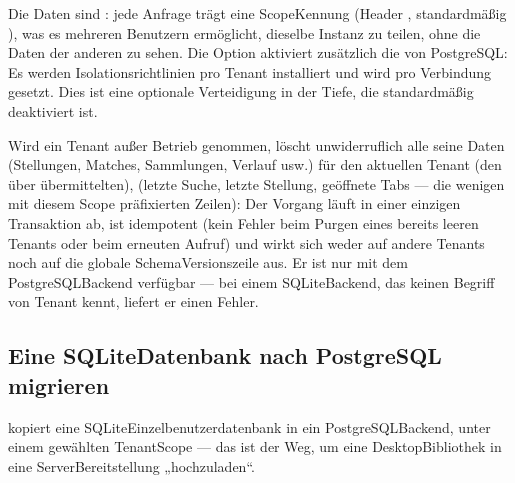 \documentclass[letterpaper,10pt,german]{sphinxmanual}
\begin{document}
\sphinxAtStartPar
Die Daten sind : jede Anfrage trägt eine Scope\sphinxhyphen{}Kennung (Header , standardmäßig ), was es mehreren Benutzern ermöglicht, dieselbe Instanz zu teilen, ohne die Daten der anderen zu sehen. Die Option  aktiviert zusätzlich die  von PostgreSQL: Es werden Isolationsrichtlinien pro Tenant installiert und  wird pro Verbindung gesetzt. Dies ist eine optionale Verteidigung in der Tiefe, die standardmäßig deaktiviert ist.

\sphinxAtStartPar
Wird ein Tenant außer Betrieb genommen, löscht  unwiderruflich alle seine Daten (Stellungen, Matches, Sammlungen, Verlauf usw.) für den aktuellen Tenant (den über  übermittelten),  (letzte Suche, letzte Stellung, geöffnete Tabs — die wenigen mit diesem Scope präfixierten \sphinxhyphen{}Zeilen): Der Vorgang läuft in einer einzigen Transaktion ab, ist idempotent (kein Fehler beim Purgen eines bereits leeren Tenants oder beim erneuten Aufruf) und wirkt sich weder auf andere Tenants noch auf die globale Schema\sphinxhyphen{}Versionszeile aus. Er ist nur mit dem PostgreSQL\sphinxhyphen{}Backend verfügbar — bei einem SQLite\sphinxhyphen{}Backend, das keinen Begriff von Tenant kennt, liefert er einen \sphinxhyphen{}Fehler.


\subsection{Eine SQLite\sphinxhyphen{}Datenbank nach PostgreSQL migrieren}
\label{\detokenize{mode_headless:migrer-une-base-sqlite-vers-postgresql}}\label{\detokenize{mode_headless:headless-migrate}}
\sphinxAtStartPar
{} kopiert eine SQLite\sphinxhyphen{}Einzelbenutzerdatenbank in ein PostgreSQL\sphinxhyphen{}Backend, unter einem gewählten Tenant\sphinxhyphen{}Scope — das ist der Weg, um eine Desktop\sphinxhyphen{}Bibliothek in eine Server\sphinxhyphen{}Bereitstellung „hochzuladen“.
\end{document}
